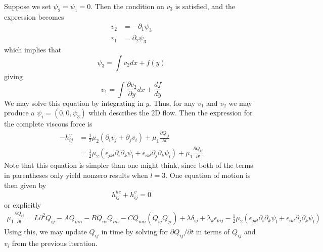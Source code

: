 \documentclass[reqno]{article}
\begin{document}
	Suppose we set $\psi_2 = \psi_1 = 0$. Then the condition on $v_3$ is satisfied, and the expression becomes
	\begin{equation}
	\begin{split}
		v_2 &= -\partial_1 \psi_3 \\
		v_1 &= \partial_2 \psi_3
	\end{split}
	\end{equation}
	which implies that
	\begin{equation}
		\psi_3 = \int v_2 dx + f(y)
	\end{equation}
	giving
	\begin{equation}
		v_1 = \int \frac{\partial v_2}{\partial y} dx + \frac{df}{dy}
	\end{equation}
	We may solve this equation by integrating in $y$. Thus, for any $v_1$ and $v_2$ we may produce a $\psi_i = (0, 0, \psi_3)$ which describes the 2D flow. Then the expression for the complete viscous force is
	\begin{equation}
	\begin{split}
		-h^v_{ij} &= \frac{1}{2}\mu_2 (\partial_i v_j + \partial_j v_i) + \mu_1 \frac{\partial Q_{ij}}{\partial t} \\
		&= \frac{1}{2}\mu_2 (\epsilon_{jkl} \partial_i \partial_k \psi_l +  \epsilon_{ikl} \partial_j \partial_k \psi_l) + \mu_1 \frac{\partial Q_{ij}}{\partial t}
	\end{split}
	\end{equation}
	Note that this equation is simpler than one might think, since both of the terms in parentheses only yield nonzero results when $l = 3$. 
	One equation of motion is then given by 
	\begin{equation}
		h^{he}_{ij} + h^{v}_{ij} = 0
	\end{equation}
	or explicitly
	\begin{multline}
		\mu_1 \frac{\partial Q_{ij}}{\partial t} = L\partial^2 Q_{ij} - A Q_{mn} - BQ_{ni}Q_{im} - C Q_{mn} (Q_{ij}Q_{ji}) + \lambda\delta_{ij} + \lambda_k \epsilon_{kij} - \frac{1}{2}\mu_2 (\epsilon_{jkl} \partial_i \partial_k \psi_l +  \epsilon_{ikl} \partial_j \partial_k \psi_l)
	\end{multline}
	Using this, we may update $Q_{ij}$ in time by solving for $\partial Q_{ij}/\partial t$ in terms of $Q_{ij}$ and $v_i$ from the previous iteration.
	
\end{document}

